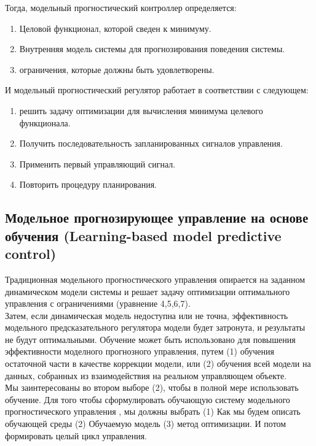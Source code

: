 \documentclass[a4paper,12pt]{article}
\begin{document}
Тогда, модельный прогностический контроллер определяется:
\begin{enumerate}
    \item Целовой функционал, которой сведен к минимуму.
\item Внутренняя модель системы для прогнозирования поведения системы.
\item ограничения, которые должны быть удовлетворены.
\end{enumerate}
\newpage
И модельный прогностический регулятор работает в соответствии с следующем:
\begin{enumerate}[noitemsep]
    \item решить задачу оптимизации для вычисления минимума целевого функционала.
\item  Получить последовательность запланированных сигналов управления.
\item  Применить первый управляющий сигнал.
\item  Повторить процедуру планирования.
\end{enumerate}

\subsection{Модельное прогнозирующее управление на основе \\
обучения (Learning-based model predictive control)}
Традиционная модельного прогностического управления опирается на заданном динамическом модели системы и решает задачу оптимизации оптимального управления с ограничениями (уравнение 4,5,6,7).\\

Затем, если динамическая модель недоступна или не точна, эффективность модельного предсказательного регулятора модели будет затронута, и результаты не будут оптимальными.
Обучение может быть использовано для повышения эффективности моделного прогнозного управления, путем (1) обучения остаточной части в качестве коррекции модели, или (2) обучения всей модели на данных, собранных из взаимодействия на реальном управляющем объекте.\\

Мы заинтересованы во втором выборе (2), чтобы в полной мере использовать обучение.
Для того чтобы сформулировать обучающую систему модельного прогностического управления , мы должны выбрать (1) Как мы будем описать обучающей среды (2) Обучаемую модель (3) метод оптимизации. И потом формировать целый цикл управления.\\
\end{document}
